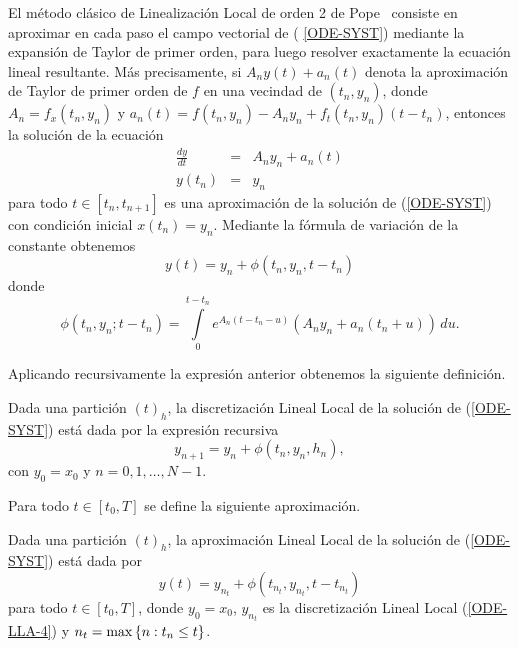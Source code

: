 El método clásico de Linealización Local de orden 2 de Pope~\cite{pope1963exponential}
 consiste en aproximar en cada paso el campo vectorial de (%
\ref{ODE-SYST}) mediante la expansión de Taylor de primer orden, para
luego resolver exactamente la ecuación lineal resultante. Más
precisamente, si $A_{n}y(t)+a_{n}(t)$ denota la aproximación de Taylor
de primer orden de $f$ en una vecindad de $(t_n,y_{n})$, donde \mbox{$
	A_{n}=f_{x}(t_n,y_{n})$} y $a_{n}(t)=f(t_n,y_{n})-A_{n}y_{n}+f_t(t_n,y_n)(t-t_n)$, entonces la
solución de la ecuación 
\begin{eqnarray*}
\frac{dy}{dt} & = & A_{n}y_n+a_{n}(t) \\ %
y(t_{n})& = & y_{n}  \nonumber
\end{eqnarray*}
para todo $t\in[t_{n},t_{n+1}]$ es una aproximación de la solución
de (\ref{ODE-SYST}) con condición inicial \mbox{$x(t_{n})=y_{n}$}. Mediante la fórmula de variación de la constante obtenemos 
\begin{equation}
y(t)=y_{n}+\phi(t_{n},y_{n},t-t_{n})  \label{ODE-SYST-FORM-LL}
\end{equation}
donde 
\begin{equation*}
\phi(t_{n},y_{n};t-t_{n})=\int\limits^{t-t_{n}}_{0} e^{{A_{n}(t-t_{n}-u)}}
(A_{n}y_{n}+a_{n}(t_{n}+u))\,du.  %
\end{equation*}

Aplicando recursivamente la expresión anterior obtenemos la siguiente
definición.

\begin{definition}
	\label{definition LLD} Dada una partición $(t)_{h}$, la discretización Lineal Local de la solución de (\ref{ODE-SYST}) está dada por la expresión recursiva
	\begin{equation}
	y_{n+1}=y_{n}+\phi \left( t_{n},y_{n},h_{n}\right) ,  \label{ODE-LLA-4}
	\end{equation}%
	con $y_{0}=x_{0}$ y $n=0,1,\ldots,N-1$.
\end{definition}

Para todo $t\in[t_{0},T]$ se define la siguiente aproximación.
\begin{definition}
	\label{definition LLA} Dada una partición $(t)_{h}$, la aproximación
	Lineal Local de la solución de (\ref{ODE-SYST}) está dada por 
	\begin{equation}
	y(t)=y_{n_{t}}+\phi(t_{n_{t}},y_{n_{t}},t-t_{n_{t}})
	\label{ODE-REV-FORM-LLA}
	\end{equation}
	para todo $t\in[t_{0},T]$, donde $y_{0}=x_{0}$, $y_{n_{t}}$ es la discretización Lineal Local (\ref{ODE-LLA-4}) y ${n_{t}=\max\left\{ n:t_{n}\leq t \right\}}$.
\end{definition}

